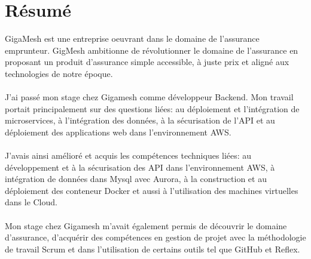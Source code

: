 \documentclass[
11pt, %
french, %
singlespacing, %
headsepline, %
]{MastersDoctoralThesis} %
\begin{document}
 



\vspace*{0.2\textheight}



\chapter*{Résumé}
GigaMesh est une entreprise oeuvrant dans le domaine de l'assurance emprunteur. GigMesh ambitionne de révolutionner le domaine 
de l'assurance en proposant un produit d'assurance simple accessible, à juste prix et aligné aux technologies de notre époque. \\ \\
J'ai passé mon stage chez Gigamesh comme développeur Backend.  Mon travail portait principalement sur des questions liées: au déploiement et l'intégration de microservices, à l'intégration des données, à la sécurisation de l'API et au  déploiement des applications web dans l'environnement AWS. \\ \\
 J'avais ainsi  amélioré et acquis les compétences techniques liées: au  développement et à la sécurisation
des API dans l'environnement AWS, à intégration de données dans Mysql avec Aurora, à la construction et au déploiement des conteneur Docker
et aussi à l’utilisation des machines virtuelles dans le Cloud.\\ \\
Mon stage chez  Gigamesh m'avait également permis de découvrir le domaine d'assurance, d’acquérir des compétences en gestion de projet avec la méthodologie de travail Scrum et dans l’utilisation de certains outils tel que GitHub et Reflex.
\end{document}

